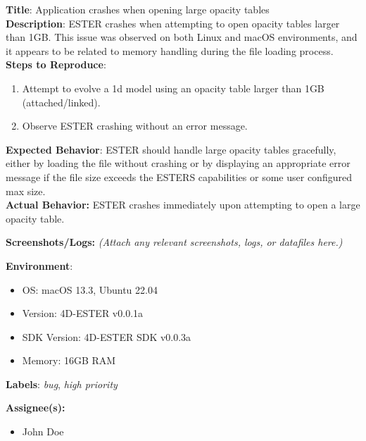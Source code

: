 \documentclass{ol-softwaremanual}
\begin{document}
\begin{example}
\textbf{Title}: Application crashes when opening large opacity tables
\\
\textbf{Description}:
ESTER crashes when attempting to open opacity tables larger than 1GB. This
issue was observed on both Linux and macOS environments, and it appears to be
related to memory handling during the file loading process.
\\
\textbf{Steps to Reproduce}:
\begin{enumerate}
    \item Attempt to evolve a 1d model using an opacity table larger than 1GB (attached/linked).
    \item Observe ESTER crashing without an error message.
\end{enumerate}
\textbf{Expected Behavior}:
ESTER should handle large opacity tables gracefully, either by loading the file
without crashing or by displaying an appropriate error message if the file size
exceeds the ESTERS capabilities or some user configured max size.
\\
\textbf{Actual Behavior:}
ESTER crashes immediately upon attempting to open a large opacity table.

\textbf{Screenshots/Logs:}
\textit{(Attach any relevant screenshots, logs, or datafiles here.)}

\textbf{Environment}:
\begin{itemize}
    \item OS: macOS 13.3, Ubuntu 22.04
    \item Version: 4D-ESTER v0.0.1a
    \item SDK Version: 4D-ESTER SDK v0.0.3a
    \item Memory: 16GB RAM
\end{itemize}
\textbf{Labels}:
\textit{bug}, \textit{high priority}

\textbf{Assignee(s):}
\begin{itemize}
    \item John Doe
\end{itemize}

\end{example}
\end{document}
